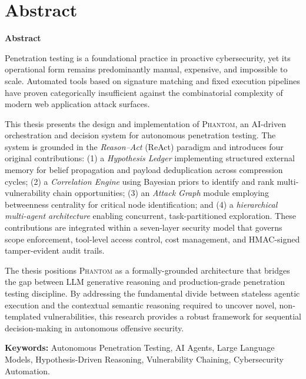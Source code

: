 \documentclass[12pt,a4paper,oneside,openany]{book}
\newcommand{\Phantom}{\textsc{Phantom}}
\newcommand{\term}[1]{\textit{#1}}
\begin{document}
\chapter*{Abstract}
\vspace{0.5cm}
\begin{center}
{\large\bfseries Abstract}
\end{center}
\vspace{0.3cm}

Penetration testing is a foundational practice in proactive cybersecurity, yet its operational form remains predominantly manual, expensive, and impossible to scale. Automated tools based on signature matching and fixed execution pipelines have proven categorically insufficient against the combinatorial complexity of modern web application attack surfaces.

This thesis presents the design and implementation of \Phantom{}, an AI-driven orchestration and decision system for autonomous penetration testing. The system is grounded in the \term{Reason–Act} (ReAct) paradigm and introduces four original contributions: (1) a \term{Hypothesis Ledger} implementing structured external memory for belief propagation and payload deduplication across compression cycles; (2) a \term{Correlation Engine} using Bayesian priors to identify and rank multi-vulnerability chain opportunities; (3) an \term{Attack Graph} module employing betweenness centrality for critical node identification; and (4) a \term{hierarchical multi-agent architecture} enabling concurrent, task-partitioned exploration. These contributions are integrated within a seven-layer security model that governs scope enforcement, tool-level access control, cost management, and HMAC-signed tamper-evident audit trails.

The thesis positions \Phantom{} as a formally-grounded architecture that bridges the gap between LLM generative reasoning and production-grade penetration testing discipline. By addressing the fundamental divide between stateless agentic execution and the contextual semantic reasoning required to uncover novel, non-templated vulnerabilities, this research provides a robust framework for sequential decision-making in autonomous offensive security.

\vfill
\noindent\textbf{Keywords:} Autonomous Penetration Testing, AI Agents, Large Language Models, Hypothesis-Driven Reasoning, Vulnerability Chaining, Cybersecurity Automation.
\clearpage
\end{document}
